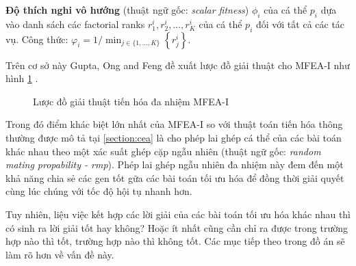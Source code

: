 \begin{definition}{\textbf{Độ thích nghi vô hướng}} (thuật ngữ gốc: \emph{scalar fitness}) $\phi_i$ của cá thể $p_i$ dựa vào danh sách các factorial ranks ${r^i_1, r^i_2, ..., r^i_K}$ của cá thể $p_i$ đối với tất cả các tác vụ. Công thức: $\varphi_{i}=1/\min_{j\in\{1,\ldots,K\}}\left\{r_{j}^{i}\right\}$.
\label{def:scalar_fitness}
\end{definition}

Trên cơ sở này Gupta, Ong and Feng đề xuất lược đồ giải thuật cho MFEA-I như hình \ref{mfea-flow} \cite{gupta2016multifactorial}.
\begin{figure}
    \centering
    \caption{Lược đồ giải thuật tiến hóa đa nhiệm MFEA-I \cite{gupta2016multifactorial}}
    \label{mfea-flow}
\end{figure}

Trong đó điểm khác biệt lớn nhất của MFEA-I so với thuật toán tiến hóa thông thường được mô tả tại \ref{section:cea} là cho phép lai ghép cá thể của các bài toán khác nhau theo một xác suất ghép cặp ngẫu nhiên (thuật ngữ gốc: \emph{random mating propability - rmp}). Phép lai ghép ngẫu nhiên đa nhiệm này đem đến một khả năng chia sẻ các gen tốt gữa các bài toán tối ưu hóa để đồng thời giải quyết cùng lúc chúng với tốc độ hội tụ nhanh hơn. 

Tuy nhiên, liệu việc kết hợp các lời giải của các bài toán tối ưu hóa khác nhau thì có sinh ra lời giải tốt hay không? Hoặc ít nhất cũng cần chỉ ra được trong trường hợp nào thì tốt, trường hợp nào thì không tốt. Các mục tiếp theo trong đồ án sẽ làm rõ hơn về vấn đề này.
